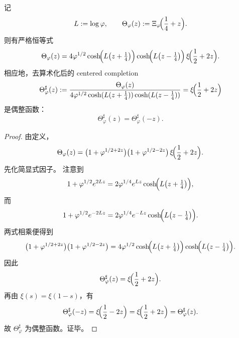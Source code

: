 \begin{theorem}\label{thm:xi-time-part9zbh-foldpi-centered-completion-factorization}
记
\[
L:=\log\varphi,
\qquad
\Theta_\varphi(z):=\Xi_\varphi\!\Bigl(\frac14+z\Bigr).
\]
则有严格恒等式
\[
\Theta_\varphi(z)
=
4\varphi^{1/2}
\cosh\!\Bigl(L\bigl(z+\tfrac14\bigr)\Bigr)
\cosh\!\Bigl(L\bigl(z-\tfrac14\bigr)\Bigr)
\,\xi\!\Bigl(\frac12+2z\Bigr).
\]
相应地，去算术化后的 centered completion
\[
\Theta_\varphi^\sharp(z)
:=
\frac{\Theta_\varphi(z)}
{4\varphi^{1/2}\cosh(L(z+\tfrac14))\cosh(L(z-\tfrac14))}
=
\xi\!\Bigl(\frac12+2z\Bigr)
\]
是偶整函数：
\[
\Theta_\varphi^\sharp(z)=\Theta_\varphi^\sharp(-z).
\]
\end{theorem}
\begin{proof}
由定义，
\[
\Theta_\varphi(z)
=
\bigl(1+\varphi^{1/2+2z}\bigr)
\bigl(1+\varphi^{1/2-2z}\bigr)
\,\xi\!\Bigl(\frac12+2z\Bigr).
\]
先化简显式因子。
注意到
\[
1+\varphi^{1/2}e^{2Lz}
=
2\varphi^{1/4}e^{Lz}\cosh\!\Bigl(L\bigl(z+\tfrac14\bigr)\Bigr),
\]
而
\[
1+\varphi^{1/2}e^{-2Lz}
=
2\varphi^{1/4}e^{-Lz}\cosh\!\Bigl(L\bigl(z-\tfrac14\bigr)\Bigr).
\]
两式相乘便得到
\[
\bigl(1+\varphi^{1/2+2z}\bigr)\bigl(1+\varphi^{1/2-2z}\bigr)
=
4\varphi^{1/2}
\cosh\!\Bigl(L\bigl(z+\tfrac14\bigr)\Bigr)
\cosh\!\Bigl(L\bigl(z-\tfrac14\bigr)\Bigr).
\]
因此
\[
\Theta_\varphi^\sharp(z)=\xi\!\Bigl(\frac12+2z\Bigr).
\]
再由 \(\xi(s)=\xi(1-s)\)，有
\[
\Theta_\varphi^\sharp(-z)
=
\xi\!\Bigl(\frac12-2z\Bigr)
=
\xi\!\Bigl(\frac12+2z\Bigr)
=
\Theta_\varphi^\sharp(z).
\]
故 \(\Theta_\varphi^\sharp\) 为偶整函数。证毕。
\end{proof}


